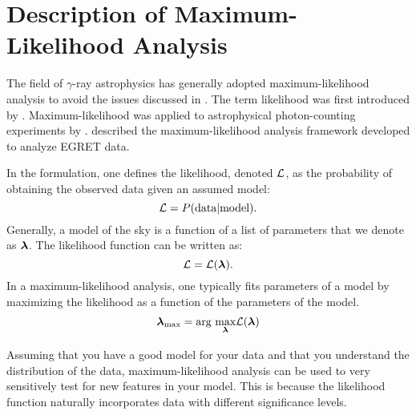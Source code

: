 \section{Description of Maximum-Likelihood Analysis}

The field of $\gamma$-ray astrophysics has generally adopted
maximum-likelihood analysis to avoid the issues discussed in
.  The term likelihood
was first introduced by \cite{fisher_1925_statistical-methods}.
Maximum-likelihood was applied to astrophysical photon-counting
experiments by \cite{cash_1979_parameter-estimation}.
\cite{mattox_1996a_likelihood-analysis} described the maximum-likelihood
analysis framework developed to analyze \ac{EGRET} data.

In the formulation, one defines the likelihood, denoted $\mathcal{L}$,
as the probability of obtaining the observed data given an assumed model:
\begin{equation}
  \mathcal{L} = P(\text{data}|\text{model}).
\end{equation}
Generally, a model of the sky is a function of a list of parameters
that we denote as $\boldsymbol{\lambda}$.  The likelihood function can
be written as:
\begin{equation}
  \mathcal{L} = \mathcal{L}(\boldsymbol{\lambda}).
\end{equation}
In a maximum-likelihood analysis, one typically fits parameters of a model
by maximizing the likelihood as a function of the parameters of the model.
\begin{equation}
\boldsymbol{\lambda}_\text{max} = \underset{}{\text{arg }}\underset{\boldsymbol{\lambda}}{\text{max}} \mathcal{L}(\boldsymbol{\lambda})
\end{equation}

Assuming that you have a good model for your data and that
you understand the distribution of the data, maximum-likelihood
analysis can be used to very sensitively test for new features in
your model.  This is because the likelihood function naturally
incorporates data with different significance levels.

